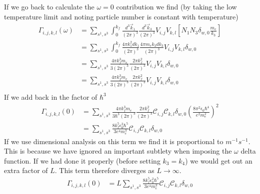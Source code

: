 If we go back to calculate the
\(\omega = 0\) contribution
we find (by taking the low
temperature limit and noting
particle number is constant
with temperature)
\begin{align}
    \Gamma_{i,j, k,l}(\omega) & =
    \sum_{s^1,s^3} \int_0^{k_f}
    \frac{d^3\vec{k}_1}{{(2\pi)}^3}
    \frac{d^3\vec{k}_3}{{(2\pi)}^3}
    V_{i,j} V_{k,l} [
    N_1 N_3 \delta_{w, 0} \frac{m_e}{k_3}] \\
                              & =
    \sum_{s^1,s^3} \int_0^{k_f}
    \frac{4\pi k_1^2 dk_1}{{(2\pi)}^3}
    \frac{4 \pi m_e k_3 dk_3}{{(2\pi)}^3}
    V_{i,j} V_{k,l} \delta_{w, 0}          \\
                              & =
    \sum_{s^1,s^3} \frac{4\pi k_f^3 m_e}{3{(2\pi)}^3}
    \frac{2 \pi k_f^2}{{(2\pi)}^3}
    V_{i,j} V_{k,l} \delta_{w, 0}          \\
                              & =
    \sum_{s^1,s^3} \frac{4\pi k_f^3 m_e}{3{(2\pi)}^3}
    \frac{2 \pi k_f^2}{{(2\pi)}^3}
    V_{i,j} V_{k,l} \delta_{w, 0}          \\
\end{align}
If we add back in the factor of  \(\hbar^3\)
\begin{align}
    \Gamma_{i,j, k,l}(0) & =
    \sum_{s^1,s^3} \frac{4\pi k_f^3 m_e}{3\hbar^3{(2\pi)}^3}
    \frac{2 \pi k_f^2}{{(2\pi)}^3}
    \mathcal{C}_{i,j} \mathcal{C}_{k,l}
    \delta_{w, 0} {(\frac{8 \pi^2 \epsilon_0 \hbar^4}{e^2 m_e^2})}^2 \\
                         & =
    \sum_{s^1,s^3}
    \frac{8k_f^5 \epsilon_0^2 \hbar^5}{3e^4 m_e^3}
    \mathcal{C}_{i,j} \mathcal{C}_{k,l} \delta_{w, 0}
\end{align}
If we use dimensional analysis on this term
we find it is proportional to \(m^{-1}s^{-1}\).
This is because we have ignored an important
subtlety when imposing the \(\omega \) delta
function. If we had done it properly (before
setting \(k_3 = k_4\)) we would get
out an extra factor of \(L\). This term
therefore diverges as \(L \rightarrow \infty \).
\begin{align}
    \Gamma_{i,j, k,l}(0) & =
    L \sum_{s^1,s^3}
    \frac{8k_f^5 \epsilon_0^2 \hbar^5}{3e^4 m_e^3}
    \mathcal{C}_{i,j} \mathcal{C}_{k,l} \delta_{w, 0}
    \label{eqn:divergent expression for first integral}
\end{align}